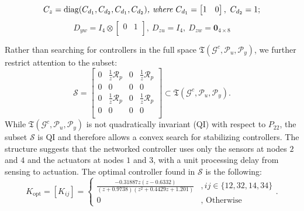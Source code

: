 \begin{equation*}
C_z = {\mathrm{diag}}(C_{d_1}, C_{d_2}, C_{d_1}, C_{d_2})
\textit{, where }
C_{d_1} = \begin{bmatrix}
1 & 0\\
\end{bmatrix},\ C_{d_2} = 1;
\end{equation*}
\begin{equation*}
D_{yw} = I_4 \otimes \begin{bmatrix}
0 & 1\\
\end{bmatrix},\ 
D_{zu} = I_4,\  
D_{zw} = \mathbf{0}_{4\times 8}
\end{equation*}



Rather than searching for controllers in the full space \(\mathfrak{T}(\mathcal{G}^c,\mathcal{P}_{u},\mathcal{P}_y)\),  we further restrict attention to the subset:
\[  
\mathcal{S} = \begin{bmatrix}
0 & \frac{1}{z}\mathcal{R}_p & 0 & \frac{1}{z}\mathcal{R}_p\\
0 & 0 & 0 & 0\\
0 & \frac{1}{z}\mathcal{R}_p & 0 & \frac{1}{z}\mathcal{R}_p\\
0 & 0 & 0 & 0\\
\end{bmatrix}\subset \mathfrak{T}(\mathcal{G}^c,\mathcal{P}_{u},\mathcal{P}_y).
\]
While \(\mathfrak{T}(\mathcal{G}^c,\mathcal{P}_{u},\mathcal{P}_y)\) is not quadratically invariant (QI) with respect to \(P_{22}\), the subset \(\mathcal{S}\) is QI and therefore allows a convex search for stabilizing controllers.
The structure suggests that the networked controller uses only the sensors at nodes \(2\) and \(4\) and the actuators at nodes \(1\) and \(3\), with a unit processing delay from sensing to actuation.
The optimal controller found in \(\mathcal{S}\) is the following:
\[
K_\mathrm{opt} = 
[K_{ij}] = 
\begin{cases}
\frac{-0.31887 z (z-0.6332)}{(z+0.9738) (z^2 + 0.4429z + 1.201)}& , ij \in \{12,32,14,34\} \\
0& \text{, Otherwise}
\end{cases}.
\]

